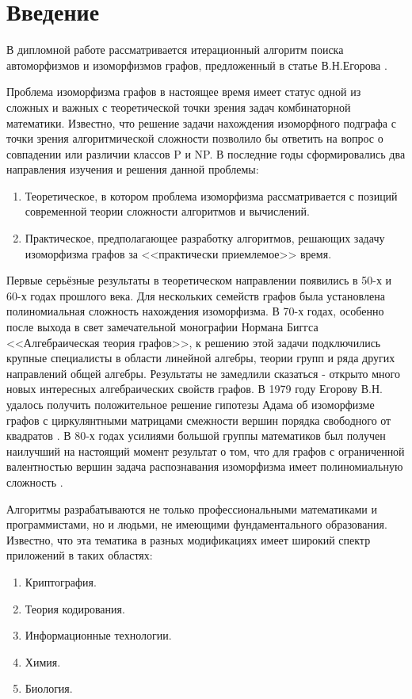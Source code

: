 \section*{Введение}
\label{sec:Introduction} 
\large 

В дипломной работе рассматривается итерационный алгоритм поиска автоморфизмов и изоморфизмов графов, предложенный в статье В.Н.Егорова \cite{ArtMain_Egorov}.

Проблема изоморфизма графов в настоящее время имеет статус одной из сложных и важных с теоретической точки зрения задач комбинаторной математики. Известно, что решение задачи нахождения изоморфного подграфа с точки зрения алгоритмической сложности позволило бы ответить на вопрос о совпадении или различии классов P и NP. В последние годы сформировались два направления изучения и решения данной проблемы:
\begin{enumerate}
\item Теоретическое, в котором проблема изоморфизма рассматривается с позиций современной теории сложности алгоритмов и вычислений.
\item Практическое, предполагающее разработку алгоритмов, решающих задачу изоморфизма графов за <<практически приемлемое>> время.
\end{enumerate}

Первые серьёзные результаты в теоретическом направлении появились в 50-х и 60-х годах прошлого века. Для нескольких семейств графов была установлена полиномиальная сложность нахождения изоморфизма. В 70-х годах, особенно после выхода в свет замечательной монографии Нормана Биггса <<Алгебраическая теория графов>>, к решению этой задачи подключились крупные специалисты в области линейной алгебры, теории групп и ряда других направлений общей алгебры. Результаты не замедлили сказаться - открыто много новых интересных алгебраических свойств графов. В 1979 году Егорову В.Н. удалось получить положительное решение гипотезы Адама об изоморфизме графов с циркулянтными матрицами смежности вершин порядка свободного от квадратов \cite{ArtCircul_EgorovMarkov}. В 80-х годах усилиями большой группы математиков был получен наилучший на настоящий момент результат о том, что для графов с ограниченной валентностью вершин задача распознавания изоморфизма имеет полиномиальную сложность \cite{ArtBoundValence_Luks}.

Алгоритмы разрабатываются не только профессиональными математиками и программистами, но и людьми, не имеющими фундаментального образования. Известно, что эта тематика в разных модификациях имеет широкий спектр приложений в таких областях:
\begin{enumerate}
\item Криптография.
\item Теория кодирования.
\item Информационные технологии.
\item Химия.
\item Биология.
\end{enumerate}

